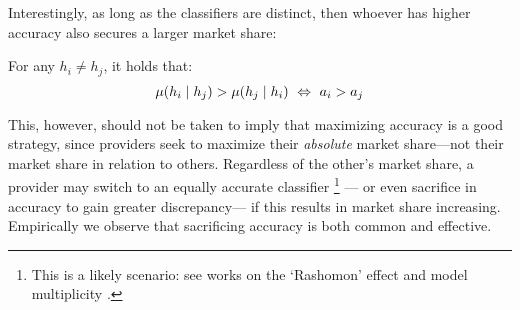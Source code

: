 
Interestingly, %
as long as the classifiers are distinct,
then whoever has higher accuracy also secures a larger market share:
\squeeze
\begin{proposition}
\label{prop:acc_iff_ms}
For any $h_i \neq h_j$,
it holds that:
\begin{equation}
\label{eq:acc_iff_ms}
\mu(h_i \mid h_j) > \mu(h_j \mid h_i)
\,\,\Leftrightarrow\,\,
a_i > a_j
\end{equation}
\end{proposition}
This, however, should not be taken to imply that maximizing accuracy is a good strategy,
since providers seek to maximize their \emph{absolute} market share---not their market share in relation to others.
Regardless of the other's market share, a provider may 
switch to an equally accurate classifier%
\footnote{This is a likely scenario: see works on the `Rashomon' effect \citep{paes2023inevitability}
and model multiplicity \citep{semenova2022existence}.
\squeeze}%
--- or even sacrifice in accuracy
to gain greater discrepancy--- if this results in market share increasing.
Empirically we observe that sacrificing accuracy is both common and effective.








